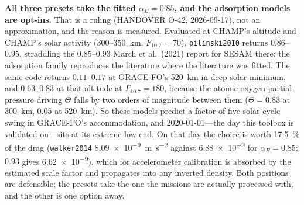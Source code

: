 \textbf{All three presets take the fitted $\alpha_E=0.85$, and the adsorption models are opt-ins.} That is a ruling (HANDOVER O-42, 2026-09-17), not an approximation, and the reason is measured. Evaluated at CHAMP's altitude and CHAMP's solar activity (\SI{300}{}--\SI{350}{\kilo\metre}, $F_{10.7}=70$), \texttt{pilinski2010} returns $0.86$--$0.95$, straddling the $0.85$--$0.93$ March et al.\ (2021) report for SESAM there: the adsorption family reproduces the literature where the literature was fitted. The same code returns $0.11$--$0.17$ at GRACE-FO's \SI{520}{\kilo\metre} in deep solar minimum, and $0.63$--$0.83$ at that altitude at $F_{10.7}=180$, because the atomic-oxygen partial pressure driving $\Theta$ falls by two orders of magnitude between them ($\Theta=0.83$ at \SI{300}{\kilo\metre}, $0.05$ at \SI{520}{\kilo\metre}). So these models predict a factor-of-five solar-cycle swing in GRACE-FO's accommodation, and \SI{2020}{}-01-01---the day this toolbox is validated on---sits at its extreme low end. On that day the choice is worth \SI{17.5}{\percent} of the drag (\texttt{walker2014} \SI{8.09e-9}{\metre\per\second\squared} against \SI{6.88e-9}{} for $\alpha_E=0.85$; $0.93$ gives \SI{6.62e-9}{}), which for accelerometer calibration is absorbed by the estimated scale factor and propagates into any inverted density. Both positions are defensible; the presets take the one the missions are actually processed with, and the other is one option away.

